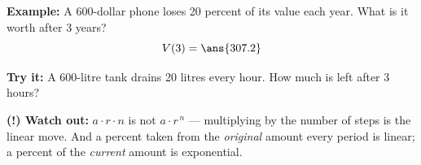 \documentclass[12pt]{article}
\begin{document}
\begin{examplebox}
\textbf{Example:} A 600-dollar phone loses 20 percent of its value each year.
What is it worth after 3 years?
\[ V(3) = \ans{307.2} \]
\end{examplebox}

\begin{tryitbox}
\textbf{Try it:} A 600-litre tank drains 20 litres every hour. How much is left
after 3 hours?\\[2pt]
\end{tryitbox}

\begin{watchoutbox}
\textbf{(!) Watch out:} $a \cdot r \cdot n$ is not $a \cdot r^{\,n}$ ---
multiplying by the number of steps is the linear move. And a percent taken from
the \emph{original} amount every period is linear; a percent of the
\emph{current} amount is exponential.
\end{watchoutbox}
\end{document}
